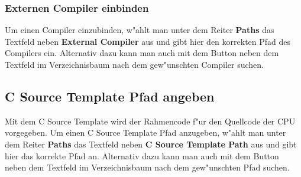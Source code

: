\documentclass[a4paper,titlepage,12pt,ngerman]{scrbook}
\begin{document}
\subsubsection{Externen Compiler einbinden}
Um einen Compiler einzubinden, w"ahlt man unter dem Reiter {\bf Paths} das Textfeld neben {\bf External Compiler} aus und gibt hier den korrekten Pfad des Compilers ein. Alternativ dazu kann man auch mit dem Button neben dem Textfeld im Verzeichnisbaum nach dem gew"unschten Compiler suchen.\par



\newpage
\subsection{C Source Template Pfad angeben}
Mit dem C Source Template wird der Rahmencode f"ur den Quellcode der CPU vorgegeben.
Um einen C Source Template Pfad anzugeben, w"ahlt man unter dem Reiter {\bf Paths} das Textfeld neben {\bf C Source Template Path} aus und gibt hier das korrekte Pfad an. Alternativ dazu kann man auch mit dem Button neben dem Textfeld im Verzeichnisbaum nach dem gew"unschten Pfad suchen. \par


\end{document}

